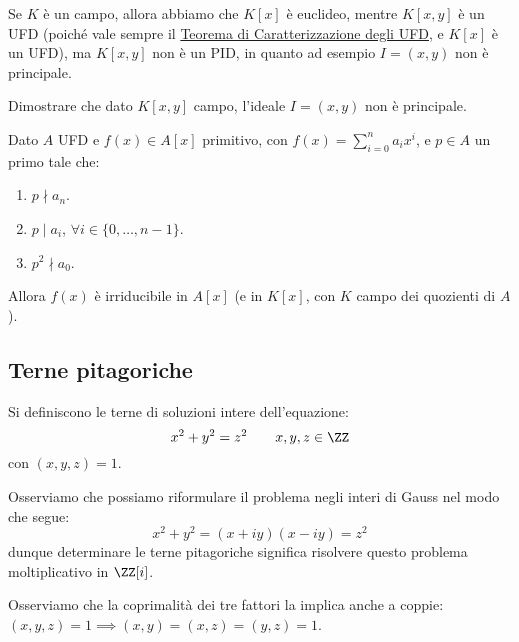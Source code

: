 \documentclass[11pt]{scrartcl}
\begin{document}
\begin{remark}
    Se $K$ è un campo, allora abbiamo che $K[x]$ è euclideo, mentre $K[x,y]$ è un UFD (poiché vale sempre il \hyperref[2.109]{Teorema di Caratterizzazione degli UFD}, e $K[x]$ è un UFD), ma
    $K[x,y]$ non è un PID, in quanto ad esempio $I = (x,y)$ non è principale.
\end{remark}

\begin{exercise}
    Dimostrare che dato $K[x,y]$ campo, l'ideale $I = (x,y)$ non è principale.
\end{exercise}

\begin{soln}
    
\end{soln}

\begin{proposition}
\label{eisenstein}
Dato $A$ UFD e $f(x) \in A[x]$ primitivo, con $f(x) = \sum_{i=0}^n a_ix^i$, e $p \in A$ un primo tale che:
\begin{enumerate}[(1)]
    \item $p \nmid a_n$.
    \item $p \mid a_i$, $\forall i \in \{0,\ldots,n-1\}$.
    \item $p^2 \nmid a_0$.
\end{enumerate}
Allora $f(x)$ è irriducibile in $A[x]$ (e in $K[x]$, con $K$ campo dei quozienti di $A$).
\end{proposition}

\newpage
\subsection{Terne pitagoriche}
\begin{definition}
    Si definiscono  le terne di soluzioni intere dell'equazione:
    \[ x^2 + y^2 = z^2 \qquad x,y,z \in \ZZ
        \]
    con  $(x,y,z) = 1$.
\end{definition}

Osserviamo che possiamo riformulare il problema negli interi di Gauss nel modo che segue:
\[ x^2+y^2 = (x+iy)(x-iy) = z^2
    \]
dunque determinare le terne pitagoriche significa risolvere questo problema moltiplicativo in $\ZZ[i]$.

\begin{remark}
    Osserviamo che la coprimalità dei tre fattori la implica anche a coppie: $(x,y,z) = 1 \implies (x,y) = (x,z) = (y,z) = 1$.
\end{remark}
\end{document}
